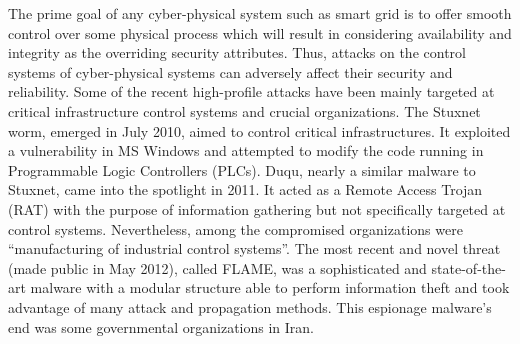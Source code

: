 \documentclass[preprint,number,12pt]{elsarticle}
\begin{document}
The prime goal of any cyber-physical system such as smart grid is to offer smooth control over some physical process \citep{Sridhar2012} which will result in considering availability and integrity as the overriding security attributes. Thus, attacks on the control systems of cyber-physical systems can  adversely affect their security and reliability. Some of the recent high-profile attacks have been mainly targeted at critical infrastructure control systems and crucial organizations. The Stuxnet worm, emerged in July 2010, aimed to control critical infrastructures. It exploited a vulnerability in MS Windows and attempted to modify the code running in Programmable Logic Controllers (PLCs)\citep{Karnouskos2011,Seo2011}. Duqu, nearly a similar malware to Stuxnet, came into the spotlight in 2011. It acted as a Remote Access Trojan (RAT) with the purpose of information gathering but not specifically targeted at control systems. Nevertheless, among the compromised organizations were “manufacturing of industrial control systems”\citep{tagkey20113,tagkey20123}. The most recent and novel threat (made public in May 2012), called FLAME\citep{SKyWIperAnalysisTeam2012}, was a sophisticated and state-of-the-art malware with a modular structure able to perform information theft and took advantage of many attack and propagation methods. This espionage malware's end was some governmental organizations in Iran\citep{Xxa}.
\end{document}
